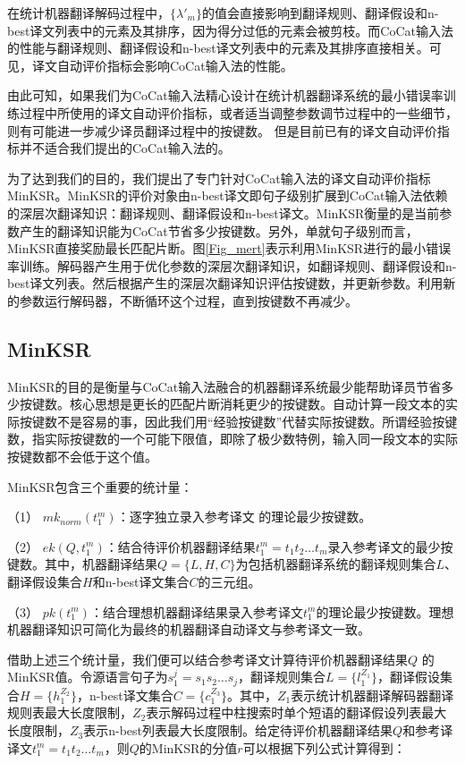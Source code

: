 在统计机器翻译解码过程中，$\{\lambda'_m\}$的值会直接影响到翻译规则、翻译假设和n-best译文列表中的元素及其排序，因为得分过低的元素会被剪枝。而CoCat输入法的性能与翻译规则、翻译假设和n-best译文列表中的元素及其排序直接相关。可见，译文自动评价指标会影响CoCat输入法的性能。

由此可知，如果我们为CoCat输入法精心设计在统计机器翻译系统的最小错误率训练过程中所使用的译文自动评价指标，或者适当调整参数调节过程中的一些细节，则有可能进一步减少译员翻译过程中的按键数。
但是目前已有的译文自动评价指标并不适合我们提出的CoCat输入法的。

为了达到我们的目的，我们提出了专门针对CoCat输入法的译文自动评价指标MinKSR。MinKSR的评价对象由n-best译文即句子级别扩展到CoCat输入法依赖的深层次翻译知识：翻译规则、翻译假设和n-best译文。MinKSR衡量的是当前参数产生的翻译知识能为CoCat节省多少按键数。另外，单就句子级别而言，MinKSR直接奖励最长匹配片断。图\ref{Fig_mert}表示利用MinKSR进行的最小错误率训练。解码器产生用于优化参数的深层次翻译知识，如翻译规则、翻译假设和n-best译文列表。然后根据产生的深层次翻译知识评估按键数，并更新参数。利用新的参数运行解码器，不断循环这个过程，直到按键数不再减少。

\subsection{MinKSR}

MinKSR的目的是衡量与CoCat输入法融合的机器翻译系统最少能帮助译员节省多少按键数。核心思想是更长的匹配片断消耗更少的按键数。自动计算一段文本的实际按键数不是容易的事，因此我们用“经验按键数”代替实际按键数。所谓经验按键数，指实际按键数的一个可能下限值，即除了极少数特例，输入同一段文本的实际按键数都不会低于这个值。

MinKSR包含三个重要的统计量：

（1） $mk_{norm}(t_1^m)$：逐字独立录入参考译文 的理论最少按键数。

（2） $ek(Q, t_1^m)$：结合待评价机器翻译结果$ t_1^m=t_1t_2 \ldots t_m$录入参考译文的最少按键数。其中，机器翻译结果$Q=\{L,H,C\}$为包括机器翻译系统的翻译规则集合$L$、翻译假设集合$H$和n-best译文集合$C$的三元组。

（3） $pk(t_1^m)$：结合理想机器翻译结果录入参考译文$t_1^m$的理论最少按键数。理想机器翻译知识可简化为最终的机器翻译自动译文与参考译文一致。

借助上述三个统计量，我们便可以结合参考译文计算待评价机器翻译结果$Q$ \linebreak
的MinKSR值。令源语言句子为$s_1^j=s_1s_2 \ldots s_j$，翻译规则集合$L=\{l_1^{Z_1}\}$，翻译假设集合$H=\{h_1^{Z_2}\} $，n-best译文集合$C=\{c_1^{Z_3}\}$。其中，$Z_1$表示统计机器翻译解码器翻译规则表最大长度限制，$Z_2$表示解码过程中柱搜索时单个短语的翻译假设列表最大长度限制，$Z_3$表示n-best列表最大长度限制。给定待评价机器翻译结果$Q$和参考译译文$ t_1^m=t_1t_2 \ldots t_m$，则$Q$的MinKSR的分值$r$可以根据下列公式计算得到：

